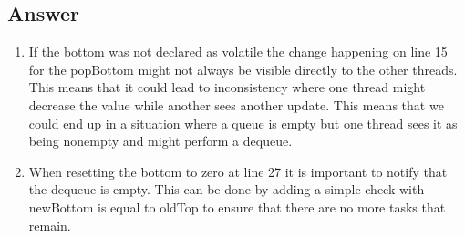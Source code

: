 \documentclass{article}
\begin{document}
\subsection*{Answer}
\begin{enumerate}
    \item If the bottom was not declared as volatile the change happening on line 15 for the popBottom might not always be visible directly to the other threads. This means that it could lead to inconsistency where one thread might decrease the value while another sees another update. This means that we could end up in a situation where a queue is empty but one thread sees it as being nonempty and might perform a dequeue.
    \item When resetting the bottom to zero at line 27 it is important to notify that the dequeue is empty. This can be done by adding a simple check with newBottom is equal to oldTop to ensure that there are no more tasks that remain.
\end{enumerate}

\newpage
\printbibliography
\end{document}

